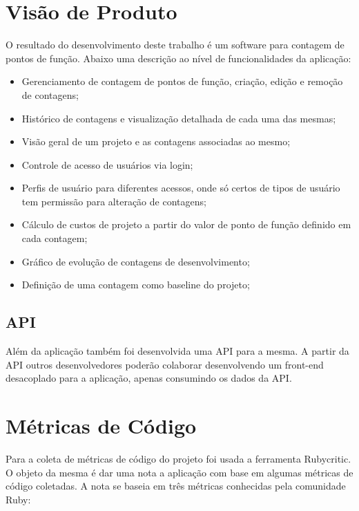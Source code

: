 \section{Visão de Produto}

O resultado do desenvolvimento deste trabalho é um software para contagem de pontos de função. Abaixo uma descrição ao nível de funcionalidades da aplicação:

\begin{itemize}
\item Gerenciamento de contagem de pontos de função, criação, edição e remoção de contagens;
\item Histórico de contagens e visualização detalhada de cada uma das mesmas;
\item Visão geral de um projeto e as contagens associadas ao mesmo;
\item Controle de acesso de usuários via login;
\item Perfis de usuário para diferentes acessos, onde só certos de tipos de usuário tem permissão para alteração de contagens;
\item Cálculo de custos de projeto a partir do valor de ponto de função definido em cada contagem;
\item Gráfico de evolução de contagens de desenvolvimento;
\item Definição de uma contagem como baseline do projeto;
\end{itemize}

\subsection{API}

Além da aplicação também foi desenvolvida uma API para a mesma. A partir da API outros desenvolvedores poderão colaborar desenvolvendo um front-end desacoplado para a aplicação, apenas consumindo os dados da API.


\section{Métricas de Código}

Para a coleta de métricas de código do projeto foi usada a ferramenta Rubycritic. O objeto da mesma é dar uma nota a aplicação com base em algumas métricas de código coletadas. A nota se baseia em três métricas conhecidas pela comunidade Ruby:

